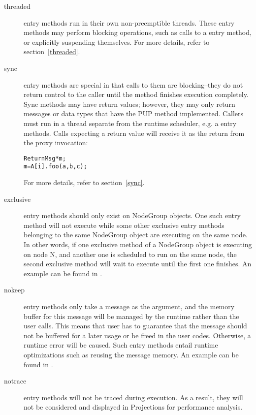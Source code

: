 \begin{description}
\item[threaded] entry methods 
run in their own non-preemptible threads. These
entry methods may perform blocking operations, such as calls to a
 entry method, or explicitly suspending themselves. For more
details, refer to section~\ref{threaded}.

\item[sync] entry methods are special in that
calls to them are blocking--they do not return control to the caller until the
method finishes execution completely. Sync methods may have return values;
however, they may only return messages or data types that have the PUP method implemented. Callers must run in a thread separate
from the runtime scheduler, e.g. a  entry methods.  Calls
expecting a return value will receive it as the return from the proxy
invocation:
\begin{alltt}
 ReturnMsg* m;
 m = A[i].foo(a, b, c);
\end{alltt}
For more details, refer to section~\ref{sync}.

\item[exclusive]  entry methods should
only exist on NodeGroup objects. One such entry method will not execute while
some other exclusive entry methods belonging to the same NodeGroup object are
executing on the same node. In other words, if one exclusive method of a
NodeGroup object is executing on node N, and another one is scheduled to run on
the same node, the second exclusive method will wait to execute until the first
one finishes. An example can be found in .

\item[nokeep] entry methods only take a message as the argument,
and the memory buffer for this message will be managed by the \charmpp{}
runtime rather than the user calls. This means that user has to guarantee that
the message should not be buffered for a later usage or be freed in the user 
codes. Otherwise, a runtime error will be caused. 
Such entry methods entail runtime 
optimizations such as reusing the message memory. An example can be found in
.

\item[notrace] entry methods will not be traced during execution. As a result, they will not be considered and displayed in Projections for
performance analysis.


\end{description}
